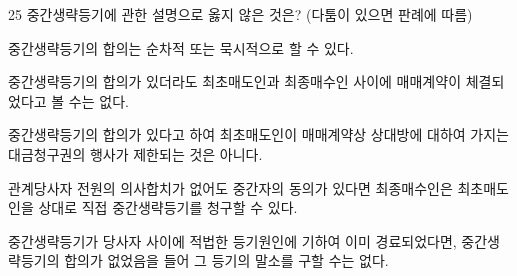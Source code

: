 \begin{question}{25}
중간생략등기에 관한 설명으로 옳지 않은 것은? (다툼이 있으면 판례에 따름)
\begin{choices}
  \item 중간생략등기의 합의는 순차적 또는 묵시적으로 할 수 있다.
  \item 중간생략등기의 합의가 있더라도 최초매도인과 최종매수인 사이에 매매계약이 체결되었다고 볼 수는 없다.
  \item 중간생략등기의 합의가 있다고 하여 최초매도인이 매매계약상 상대방에 대하여 가지는 대금청구권의 행사가 제한되는 것은 아니다.
  \item 관계당사자 전원의 의사합치가 없어도 중간자의 동의가 있다면 최종매수인은 최초매도인을 상대로 직접 중간생략등기를 청구할 수 있다.
  \item 중간생략등기가 당사자 사이에 적법한 등기원인에 기하여 이미 경료되었다면, 중간생략등기의 합의가 없었음을 들어 그 등기의 말소를 구할 수는 없다.
\end{choices}
\end{question}
